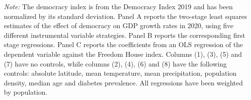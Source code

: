 {\begin{table}[]
\begin{threeparttable}
\begin{tablenotes}
\item {\footnotesize {\textit{Note:} The democracy index is from the Democracy Index 2019 and has been normalized by its standard deviation. Panel A reports the two-stage least squares estimates of the effect of democracy on GDP growth rates in 2020, using five different instrumental variable strategies. Panel B reports the corresponding first stage regressions. Panel C reports the coefficients from an OLS regression of the dependent variable against the Freedom House index.  Columns (1), (3), (5) and (7) have no controls, while columns (2), (4), (6) and (8) have the following controls: absolute latitude, mean temperature, mean precipitation, population density, median age and diabetes prevalence. All regressions have been weighted by population.}}
\end{tablenotes}
\end{threeparttable}

\end{table} 


\clearpage
{}
\recalctypearea
}

